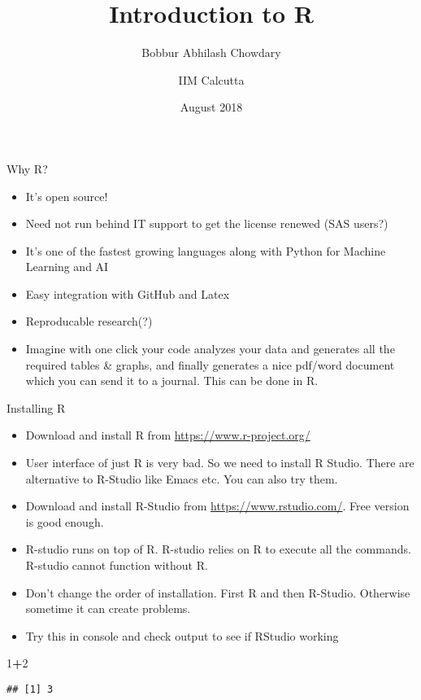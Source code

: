 \documentclass[ignorenonframetext,]{beamer}
\title{Introduction to R}
\author{Bobbur Abhilash Chowdary \and IIM Calcutta}
\date{August 2018}
\newenvironment{Shaded}{\begin{snugshade}}{\end{snugshade}}
\newcommand{\DecValTok}[1]{\textcolor[rgb]{0.00,0.00,0.81}{#1}}
\newcommand{\OperatorTok}[1]{\textcolor[rgb]{0.81,0.36,0.00}{\textbf{#1}}}
\providecommand{\tightlist}{%
  \setlength{\itemsep}{0pt}\setlength{\parskip}{0pt}}
\begin{document}
\frame{\titlepage}

\begin{frame}{Why R?}
\protect\hypertarget{why-r}{}

\begin{itemize}[<+->]
\tightlist
\item
  It's open source!
\item
  Need not run behind IT support to get the license renewed (SAS users?)
\item
  It's one of the fastest growing languages along with Python for
  Machine Learning and AI
\item
  Easy integration with GitHub and Latex
\item
  Reproducable research(?)
\item
  Imagine with one click your code analyzes your data and generates all
  the required tables \& graphs, and finally generates a nice pdf/word
  document which you can send it to a journal. This can be done in R.
\end{itemize}

\end{frame}

\begin{frame}[fragile]{Installing R}
\protect\hypertarget{installing-r}{}

\begin{itemize}
\item
  Download and install R from \url{https://www.r-project.org/}
\item
  User interface of just R is very bad. So we need to install R Studio.
  There are alternative to R-Studio like Emacs etc. You can also try
  them.
\item
  Download and install R-Studio from \url{https://www.rstudio.com/}.
  Free version is good enough.
\item
  R-studio runs on top of R. R-studio relies on R to execute all the
  commands. R-studio cannot function without R.
\item
  Don't change the order of installation. First R and then R-Studio.
  Otherwise sometime it can create problems.
\item
  Try this in console and check output to see if RStudio working
\end{itemize}

\begin{Shaded}
\begin{Highlighting}[]
\DecValTok{1}\OperatorTok{+}\DecValTok{2}
\end{Highlighting}
\end{Shaded}

\begin{verbatim}
## [1] 3
\end{verbatim}

\end{frame}
\end{document}
